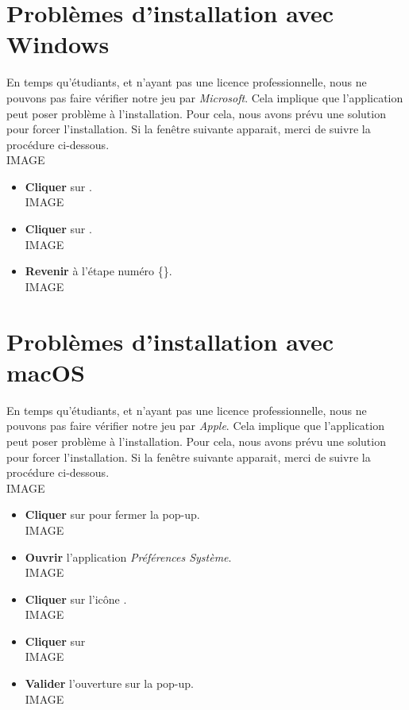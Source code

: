 \documentclass[a4paper,12pt]{article}
\begin{document}
    \section{Problèmes d'installation avec Windows}
        En temps qu'étudiants, et n'ayant pas une licence professionnelle, nous ne pouvons 
        pas faire vérifier notre jeu par \textsl{Microsoft}.
        Cela implique que l'application peut poser problème à l'installation.
        Pour cela, nous avons prévu une solution pour forcer l'installation.
        Si la fenêtre suivante apparait, merci de suivre la procédure ci-dessous.
        \\IMAGE
        \begin{itemize}
            \item 
                \textbf{Cliquer} sur .
                \\IMAGE
            \item
            \textbf{Cliquer} sur .
                \\IMAGE
            \item
            \textbf{Revenir} à l'étape numéro \{\}.
                \\IMAGE
        \end{itemize}


    \section{Problèmes d'installation avec macOS}
        En temps qu'étudiants, et n'ayant pas une licence professionnelle, nous ne pouvons 
        pas faire vérifier notre jeu par \textsl{Apple}.
        Cela implique que l'application peut poser problème à l'installation.
        Pour cela, nous avons prévu une solution pour forcer l'installation.
        Si la fenêtre suivante apparait, merci de suivre la procédure ci-dessous.
        \\IMAGE

        \begin{itemize}
            \item 
                \textbf{Cliquer} sur  pour fermer la pop-up.
                \\IMAGE
            \item
                \textbf{Ouvrir} l'application \textsl{Préférences Système}.
                \\IMAGE
            \item
                \textbf{Cliquer} sur l'icône .
                \\IMAGE
             \item
                 \textbf{Cliquer} sur 
                \\IMAGE
             \item
                 \textbf{Valider} l'ouverture sur la pop-up.
                 \\IMAGE
        \end{itemize}
\end{document}
